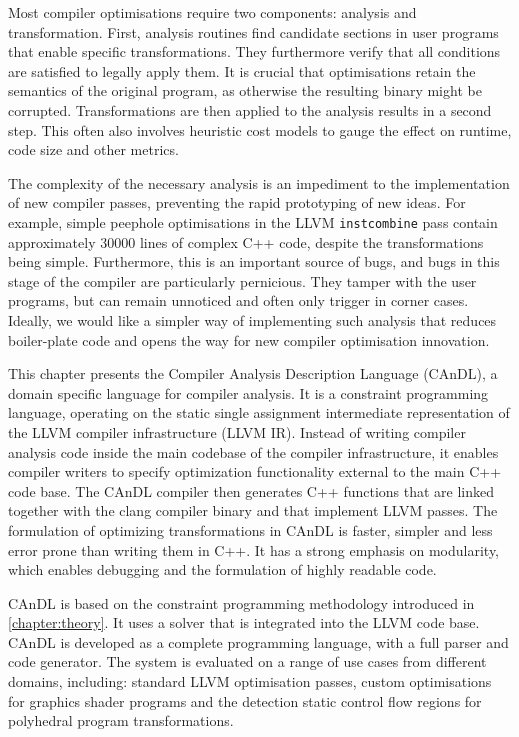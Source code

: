     Most compiler optimisations require two components:
    analysis and transformation.
    First, analysis routines find candidate sections in user programs that
    enable specific transformations.
    They furthermore verify that all conditions are satisfied to legally apply
    them.
    It is crucial that optimisations retain the semantics of the original
    program, as otherwise the resulting binary might be corrupted.
    Transformations are then applied to the analysis results in a second step.
    This often also involves heuristic cost models to gauge the effect on
    runtime, code size and other metrics.

    The complexity of the necessary analysis is an impediment to
    the implementation of new compiler passes, preventing the rapid
    prototyping of new ideas.
    For example, simple peephole optimisations in the LLVM {\tt instcombine}
    pass contain approximately 30000 lines of complex C++ code, despite the
    transformations being simple.
    Furthermore, this is an important source of bugs, and bugs in this stage of
    the compiler are particularly pernicious.
    They tamper with the user programs, but can remain unnoticed and often only
    trigger in corner cases.
    Ideally, we would like a simpler way of implementing such analysis that
    reduces boiler-plate code and opens the way for new compiler optimisation
    innovation.

    This chapter presents the Compiler Analysis Description Language (CAnDL), a
    domain specific language for compiler analysis.
    It is a constraint programming language, operating on the static single
    assignment intermediate representation of the LLVM compiler infrastructure
    (LLVM IR).
    Instead of writing compiler analysis code inside the main codebase of the
    compiler infrastructure, it enables compiler writers to specify optimization
    functionality external to the main C++ code base.
    The CAnDL compiler then generates C++ functions that are linked together
    with the clang compiler binary and that implement LLVM passes.
    The formulation of optimizing transformations in CAnDL is faster, simpler
    and less error prone than writing them in C++.
    It has a strong emphasis on modularity, which enables debugging and the
    formulation of highly readable code.

    CAnDL is based on the constraint programming methodology introduced in
    \autoref{chapter:theory}.
    It uses a solver that is integrated into the LLVM code base.
    CAnDL is developed as a complete programming language, with a full parser
    and code generator.
    The system is evaluated on a range of use cases from
    different domains, including: standard LLVM optimisation passes,
    custom optimisations for graphics shader programs and the detection static
    control flow regions for polyhedral program transformations.

